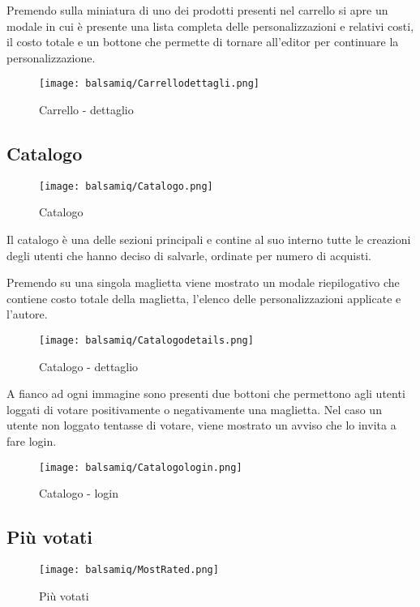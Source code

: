 \documentclass[12pt,italian,]{report}
\begin{document}
Premendo sulla miniatura di uno dei prodotti presenti nel carrello si
apre un modale in cui è presente una lista completa delle
personalizzazioni e relativi costi, il costo totale e un bottone che
permette di tornare all'editor per continuare la personalizzazione.

\begin{figure}
\centering
\texttt{[image: balsamiq/Carrellodettagli.png]}
\caption{Carrello - dettaglio}
\end{figure}

\hypertarget{catalogo}{%
\subsection{Catalogo}\label{catalogo}}

\begin{figure}
\centering
\texttt{[image: balsamiq/Catalogo.png]}
\caption{Catalogo}
\end{figure}

Il catalogo è una delle sezioni principali e contine al suo interno
tutte le creazioni degli utenti che hanno deciso di salvarle, ordinate
per numero di acquisti.

Premendo su una singola maglietta viene mostrato un modale riepilogativo
che contiene costo totale della maglietta, l'elenco delle
personalizzazioni applicate e l'autore.

\begin{figure}
\centering
\texttt{[image: balsamiq/Catalogodetails.png]}
\caption{Catalogo - dettaglio}
\end{figure}

A fianco ad ogni immagine sono presenti due bottoni che permettono agli
utenti loggati di votare positivamente o negativamente una maglietta.
Nel caso un utente non loggato tentasse di votare, viene mostrato un
avviso che lo invita a fare login.

\begin{figure}
\centering
\texttt{[image: balsamiq/Catalogologin.png]}
\caption{Catalogo - login}
\end{figure}

\hypertarget{piuxf9-votati}{%
\subsection{Più votati}\label{piuxf9-votati}}

\begin{figure}
\centering
\texttt{[image: balsamiq/MostRated.png]}
\caption{Più votati}
\end{figure}
\end{document}
